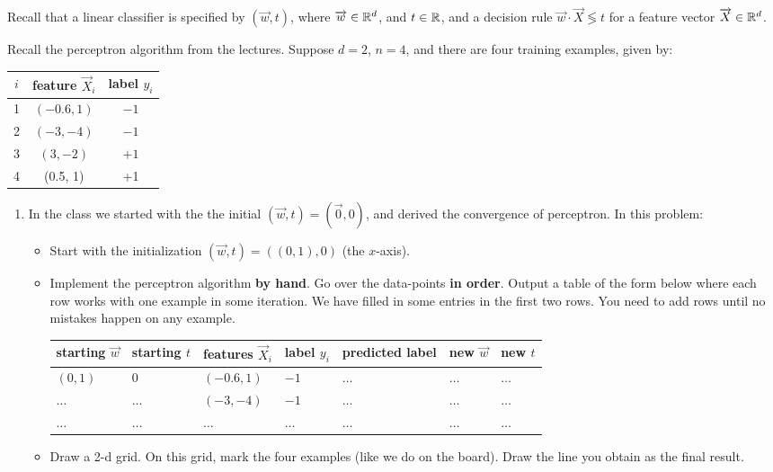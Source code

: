 \documentclass[11pt]{article}
\newenvironment{problem}[2][Problem]{\begin{trivlist}
\item[\hskip \labelsep {\bfseries #1}\hskip \labelsep {\bfseries #2.}]}{\end{trivlist}}
\begin{document}
\begin{problem}{1 (10 points)}
Recall that a linear classifier is specified by $(\overrightarrow{w},t)$, where $\overrightarrow{w}\in\mathbb{R}^d$, and $t\in\mathbb{R}$,  and a decision rule $\overrightarrow{w}\cdot \overrightarrow{X} \lessgtr t$ for a feature vector $\overrightarrow X\in\mathbb{R}^d$.  

Recall the perceptron algorithm from the lectures. Suppose $d=2$,  $n=4$, and there are four training examples, given by:
\begin{center}
  \begin{tabular}{| c | c | c |}
 \hline
$i$ &  feature $\overrightarrow X_i$ & label $y_i$\\
 \hline
1 & $(-0.6, 1)$& $-1$\\
2 & $(-3, -4)$& $-1$\\
3& $(3, -2)$& $+1$\\
4&  (0.5, 1)& +1\\\hline
  \end{tabular}
\end{center}

\begin{enumerate}
	\item 
In the class we started with the the initial $(\overrightarrow w, t)=(\overrightarrow 0,0)$, and derived the convergence of perceptron. In this problem:
\begin{itemize}
\item
Start with the initialization $(\overrightarrow w, t)= ( (0,1), 0)$ (the $x$-axis).
\item
Implement the perceptron algorithm \textbf{by hand}. Go over the data-points \textbf{in order}. Output a table of the form below where each row works with one example in some iteration. We have filled in some entries in the first two rows. You need to add rows until no mistakes happen on any example.
\begin{center}
  \begin{tabular}{ |l |l | l | l | l | l | l| }
    \hline
     starting $\overrightarrow w$  & starting $t$  & features $\overrightarrow X_i$& label $y_i$ & predicted label & new $\overrightarrow w$ & new $t$ \\ \hline
     $(0,1)$ & 0&  $(-0.6, 1)$ & $-1$ & $\ldots$ & $\ldots$ &$\ldots$ \\ \hline            $\ldots$ & $\ldots$ &$(-3, -4)$ & $-1$ & $\ldots$ & $\ldots$& $\ldots$\\ \hline 
          $\ldots$ &$\ldots$ & $\ldots$ & $\ldots$ & $\ldots$ & $\ldots$ & $\ldots$\\ \hline 
  \end{tabular}
\end{center}
\item
Draw a 2-d grid. On this grid, mark the four examples (like we do on the board). Draw the line you obtain as the final result. 
\end{itemize}
\end{enumerate}
\end{problem}
\end{document}
